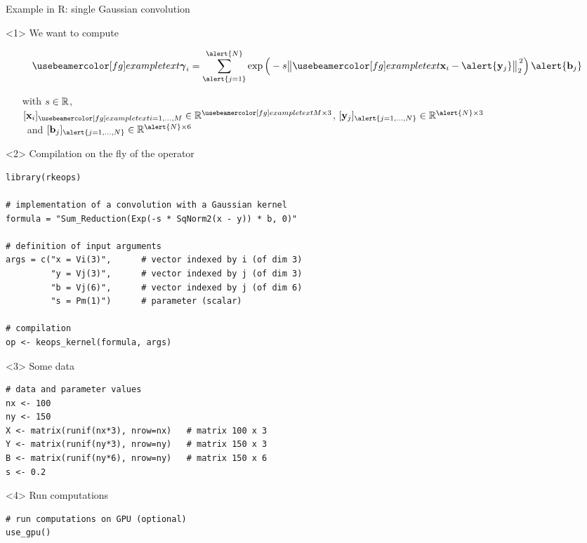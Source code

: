 \documentclass[12pt,aspectratio=1610]{beamer}
\begin{document}
\begin{frame}[fragile]{Example in R: single Gaussian convolution}

\begin{onlyenv}<1>
We want to compute\medskip

\[
\myexample{\mbg\gamma_i} = \sum_{\alert{j=1}}^{\alert{N}}  \exp\Big(-s \Vertt \myexample{\mb x_i} - \alert{\mb y_j}\Vertt_2^{\,2}\Big)\,\alert{\mb b_j}
\]
\bigskip

\begin{itemize}
\item[with] $s\in\mathbb{R}$,\\ $[\mb x_i]_{\myexample{i=1,\hdots,M}} \in\RR^{\myexample{M}\times 3}$, $[\mb y_j]_{\alert{j=1,\hdots,N}} \in\RR^{\alert{N}\times 3}$\\\ and $[\mb b_j]_{\alert{j=1,\hdots,N}} \in\RR^{\alert{N}\times 6}$
\end{itemize}
\end{onlyenv}

\begin{onlyenv}<2>
Compilation on the fly of the operator
\begin{verbatim}
library(rkeops)

# implementation of a convolution with a Gaussian kernel
formula = "Sum_Reduction(Exp(-s * SqNorm2(x - y)) * b, 0)"

# definition of input arguments
args = c("x = Vi(3)",      # vector indexed by i (of dim 3)
         "y = Vj(3)",      # vector indexed by j (of dim 3)
         "b = Vj(6)",      # vector indexed by j (of dim 6)
         "s = Pm(1)")      # parameter (scalar)
         
# compilation
op <- keops_kernel(formula, args)
\end{verbatim}
\end{onlyenv}

\begin{onlyenv}<3>
Some data
\begin{verbatim}
# data and parameter values
nx <- 100
ny <- 150
X <- matrix(runif(nx*3), nrow=nx)   # matrix 100 x 3
Y <- matrix(runif(ny*3), nrow=ny)   # matrix 150 x 3
B <- matrix(runif(ny*6), nrow=ny)   # matrix 150 x 6
s <- 0.2
\end{verbatim}
\end{onlyenv}

\begin{onlyenv}<4>
Run computations
\begin{verbatim}
# run computations on GPU (optional)
use_gpu()



\end{verbatim}
\end{onlyenv}
\end{frame}
\end{document}
